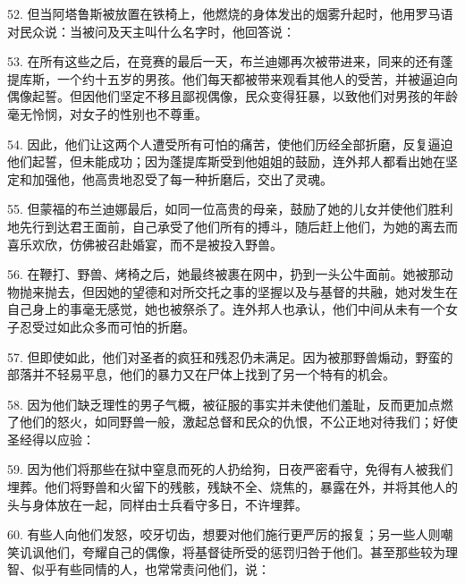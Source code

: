 52. 但当阿塔鲁斯被放置在铁椅上，他燃烧的身体发出的烟雾升起时，他用罗马语对民众说：当被问及天主叫什么名字时，他回答说：\par

53. 在所有这些之后，在竞赛的最后一天，布兰迪娜再次被带进来，同来的还有蓬提库斯，一个约十五岁的男孩。他们每天都被带来观看其他人的受苦，并被逼迫向偶像起誓。但因他们坚定不移且鄙视偶像，民众变得狂暴，以致他们对男孩的年龄毫无怜悯，对女子的性别也不尊重。\par

54. 因此，他们让这两个人遭受所有可怕的痛苦，使他们历经全部折磨，反复逼迫他们起誓，但未能成功；因为蓬提库斯受到他姐姐的鼓励，连外邦人都看出她在坚定和加强他，他高贵地忍受了每一种折磨后，交出了灵魂。\par

55. 但蒙福的布兰迪娜最后，如同一位高贵的母亲，鼓励了她的儿女并使他们胜利地先行到达君王面前，自己承受了他们所有的搏斗，随后赶上他们，为她的离去而喜乐欢欣，仿佛被召赴婚宴，而不是被投入野兽。\par

56. 在鞭打、野兽、烤椅之后，她最终被裹在网中，扔到一头公牛面前。她被那动物抛来抛去，但因她的望德和对所交托之事的坚握以及与基督的共融，她对发生在自己身上的事毫无感觉，她也被祭杀了。连外邦人也承认，他们中间从未有一个女子忍受过如此众多而可怕的折磨。\par

57. 但即使如此，他们对圣者的疯狂和残忍仍未满足。因为被那野兽煽动，野蛮的部落并不轻易平息，他们的暴力又在尸体上找到了另一个特有的机会。\par

58. 因为他们缺乏理性的男子气概，被征服的事实并未使他们羞耻，反而更加点燃了他们的怒火，如同野兽一般，激起总督和民众的仇恨，不公正地对待我们；好使圣经得以应验：\par

59. 因为他们将那些在狱中窒息而死的人扔给狗，日夜严密看守，免得有人被我们埋葬。他们将野兽和火留下的残骸，残缺不全、烧焦的，暴露在外，并将其他人的头与身体放在一起，同样由士兵看守多日，不许埋葬。\par

60. 有些人向他们发怒，咬牙切齿，想要对他们施行更严厉的报复；另一些人则嘲笑讥讽他们，夸耀自己的偶像，将基督徒所受的惩罚归咎于他们。甚至那些较为理智、似乎有些同情的人，也常常责问他们，说：\par


